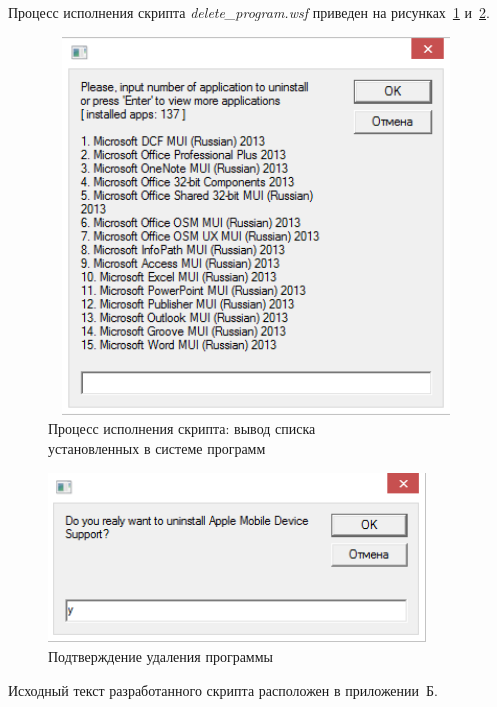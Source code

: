 Процесс исполнения скрипта \textit{delete\_program.wsf} приведен на
рисунках~\ref{fig:process} и~\ref{fig:delete_confirmation}.

\begin{figure}[htbp]
  \centering
  \includegraphics[width=110mm,height=100mm]{img/process}
  \caption{Процесс исполнения скрипта: вывод списка \\
   установленных в системе программ}
  \label{fig:process}
\end{figure}

\begin{figure}[htbp]
  \centering
  \includegraphics[width=100mm,height=45mm]{img/delete_confirmation}
  \caption{Подтверждение удаления программы}
  \label{fig:delete_confirmation}
\end{figure}

Исходный текст разработанного скрипта расположен в приложении~Б.

\newpage
